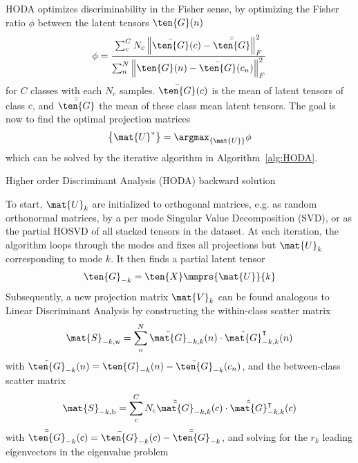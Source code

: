 HODA optimizes discriminability in the Fisher sense, by optimizing the
Fisher ratio $\phi$ between the latent tensors $\ten{G}(n)$
\begin{equation}
	\phi = \frac{\sum_c^CN_c\left\lVert\bar{\ten{G}}(c)-\bar{\bar{\ten{G}}}\right\rVert_F^2}
	{\sum_n^N\left\lVert\ten{G}(n)-\bar{\ten{G}}(c_n)\right\rVert_F^2}
	\label{eq:fisher}
\end{equation}
for $C$ classes with each $N_c$ samples. $\bar{\ten{G}}(c)$ is the mean of
latent
tensors of class $c$, and $\bar{\bar{\ten{G}}}$ the mean of
these class mean latent tensors.
The goal is now to find the optimal projection matrices
\begin{equation}
	\left\{\mat{U}^*\right\} = \argmax_{\{\mat{U}\}}\phi
\end{equation}
which can be solved by the iterative algorithm in Algorithm~\ref{alg:HODA}.
\begin{algorithm}
	\caption{Higher order Discriminant Analysis (HODA) backward solution}
	\label{alg:HODA}
	
\end{algorithm}
To start, $\mat{U}_k$ are initialized to orthogonal matrices, e.g. as random
orthonormal matrices, by a per mode Singular Value Decomposition (SVD),
or as the partial HOSVD of all stacked tensors in the dataset.
At each iteration, the algorithm loops through the modes and fixes all
projections but $\mat{U}_k$ corresponding to mode $k$.
It then finds a partial latent tensor
\begin{equation}
	\ten{G}_{-k}=\ten{X}\mmprs{\mat{U}}{k}
\end{equation}
Subsequently, a new projection matrix $\mat{V}_k$ can be found analogous to Linear
Discriminant Analysis by constructing the within-class scatter matrix
\begin{equation}
	\mat{S}_{-k,\text{w}} = \sum_n^N\tilde{\mat{G}}_{-k,k}(n)\cdot\tilde{\mat{G}}_{-k,k}^\intercal(n)
\end{equation}
with $\tilde{\ten{G}}_{-k}(n) = \ten{G}_{-k}(n) - \bar{\ten{G}}_{-k}(c_n)$,
and the between-class scatter matrix
\begin{equation}
	\mat{S}_{-k,\text{b}} =
	\sum_c^CN_c\tilde{\bar{\mat{G}}}_{-k,k}(c)\cdot\tilde{\bar{\mat{G}}}_{-k,k}^\intercal(c)
\end{equation}
with $\tilde{\bar{\ten{G}}}_{-k}(c) = \bar{\ten{G}}_{-k}(c) - \bar{\bar{\ten{G}}}_{-k}$,
and solving for the $r_k$ leading eigenvectors in the eigenvalue problem
